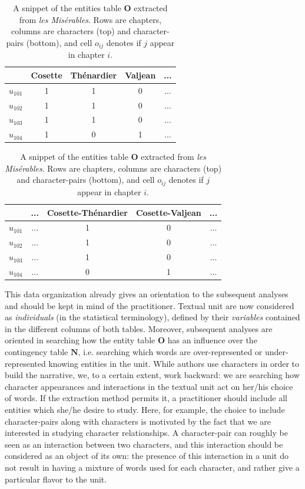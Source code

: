 \documentclass[
twocolumn,
]{ceurart}
\begin{document}
\begin{table}[h]
	\scriptsize
	\begin{tabular}{|c||c|c|c|c|}
		\hline
		& Cosette & Thénardier & Valjean & ... \\
		\hline
		\hline 
		$u_{101}$ & 1 & 1 & 0 & ... \\
		\hline
		$u_{102}$ & 1 & 1 & 0 & ... \\
		\hline
		$u_{103}$ & 1 & 1 & 0 & ... \\
		\hline
		$u_{104}$ & 1 & 0 & 1 & ... \\
		\hline
	\end{tabular}
	\begin{tabular}{|c||c|c|c|c|}
		\hline
		& ... & Cosette-Thénardier & Cosette-Valjean & ... \\
		\hline
		\hline 
		$u_{101}$  	& ... & 1 & 0 &  ... \\
		\hline
		$u_{102}$ 	& ... & 1 & 0 & ... \\
		\hline
		$u_{103}$  	& ... & 1 & 0 & ... \\
		\hline
		$u_{104}$ 	& ... & 0 & 1 & ... \\
		\hline
	\end{tabular}
	\label{occ_table}
	\caption{A snippet of the entities table $\mathbf{O}$ extracted from \emph{les Misérables}. Rows are chapters, columns are characters (top) and character-pairs (bottom), and cell $o_{ij}$ denotes if $j$ appear in chapter $i$.}
\end{table}

This data organization already gives an orientation to the subsequent analyses and should be kept in mind of the practitioner. Textual unit are now considered as \emph{individuals} (in the statistical terminology), defined by their \emph{variables} contained in the different columns of both tables. Moreover, subsequent analyses are oriented in searching how the entity table $\mathbf{O}$ has an influence over the contingency table $\mathbf{N}$, i.e. searching which words are over-represented or under-represented knowing entities in the unit. While authors use characters in order to build the narrative, we, to a certain extent, work backward: we are searching how character appearances and interactions in the textual unit act on her/his choice of words. If the extraction method permits it, a practitioner should include all entities which she/he desire to study. Here, for example, the choice to include character-pairs along with characters is motivated by the fact that we are interested in studying character relationships. A character-pair can roughly be seen as an interaction between two characters, and this interaction should be considered as an object of its own: the presence of this interaction in a unit do not result in having a mixture of words used for each character, and rather give a particular flavor to the unit. 
\end{document}

